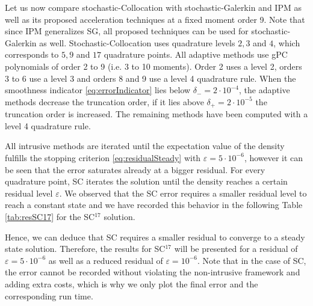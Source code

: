 Let us now compare stochastic-Collocation with stochastic-Galerkin and IPM as well as its proposed acceleration techniques at a fixed moment order 9. Note that since IPM generalizes SG, all proposed techniques can be used for stochastic-Galerkin as well. Stochastic-Collocation uses quadrature levels $2,3$ and $4$, which corresponds to $5,9$ and $17$ quadrature points. All adaptive methods use gPC polynomials of order 2 to 9 (i.e. 3 to 10 moments). Order 2 uses a level 2, orders 3 to 6 use a level 3 and orders 8 and 9 use a level 4 quadrature rule. When the smoothness indicator \eqref{eq:errorIndicator} lies below $\delta_{-} = 2\cdot 10^{-4}$, the adaptive methods decrease the truncation order, if it lies above $\delta_{+} = 2\cdot 10^{-5}$ the truncation order is increased. The remaining methods have been computed with a level 4 quadrature rule. 

All intrusive methods are iterated until the expectation value of the density fulfills the stopping criterion \eqref{eq:residualSteady} with $\varepsilon = 5\cdot 10^{-6}$, however it can be seen that the error saturates already at a bigger residual. For every quadrature point, SC iterates the solution until the density reaches a certain residual level $\varepsilon$. We observed that the SC error requires a smaller residual level to reach a constant state and we have recorded this behavior in the following Table \ref{tab:resSC17} for the SC$^{17}$ solution. 
\begin{center}
\begin{table}
\caption{Error values at various residual levels when using SC.}
\label{tab:resSC17}
\end{table}

\end{center}
Hence, we can deduce that SC requires a smaller residual to converge to a steady state solution. Therefore, the results for SC$^{17}$ will be presented for a residual of $\varepsilon = 5\cdot 10^{-6}$ as well as a reduced residual of $\varepsilon = 10^{-6}$. Note that in the case of SC, the error cannot be recorded without violating the non-intrusive framework and adding extra costs, which is why we only plot the final error and the corresponding run time.    %

